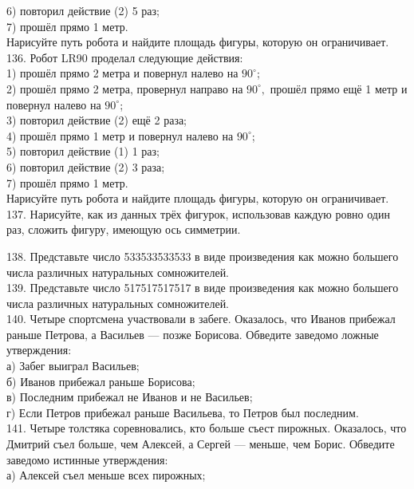 6) повторил действие (2) 5 раз;\\
7) прошёл прямо 1 метр.\\
Нарисуйте путь робота и найдите площадь фигуры, которую он ограничивает.\\
136. Робот LR90 проделал следующие действия:\\
1) прошёл прямо 2 метра и повернул налево на $90^\circ$;\\
2) прошёл прямо 2 метра, провернул направо на $90^\circ,$ прошёл прямо ещё 1 метр и повернул налево на $90^\circ$;\\
3) повторил действие (2) ещё 2 раза;\\
4) прошёл прямо 1 метр и повернул налево на $90^\circ$;\\
5) повторил действие (1) 1 раз;\\
6) повторил действие (2) 3 раза;\\
7) прошёл прямо 1 метр.\\
Нарисуйте путь робота и найдите площадь фигуры, которую он ограничивает.\\
137. Нарисуйте, как из данных трёх фигурок, использовав каждую ровно один раз, сложить фигуру, имеющую ось симметрии.
\begin{center}
\begin{figure}[ht!]
\end{figure}
\end{center}
138. Представьте число 533533533533 в виде произведения как можно большего числа различных натуральных сомножителей.\\
139. Представьте число 517517517517 в виде произведения как можно большего числа различных натуральных сомножителей.\\
140. Четыре спортсмена участвовали в забеге. Оказалось, что Иванов прибежал раньше Петрова, а Васильев --- позже Борисова. Обведите заведомо ложные утверждения:\\
а) Забег выиграл Васильев;\\
б) Иванов прибежал раньше Борисова;\\
в) Последним прибежал не Иванов и не Васильев;\\
г) Если Петров прибежал раньше Васильева, то Петров был последним.\\
141. Четыре толстяка соревновались, кто больше съест пирожных. Оказалось, что Дмитрий съел больше, чем Алексей, а Сергей --- меньше, чем Борис. Обведите заведомо истинные утверждения:\\
а) Алексей съел меньше всех пирожных;\\
